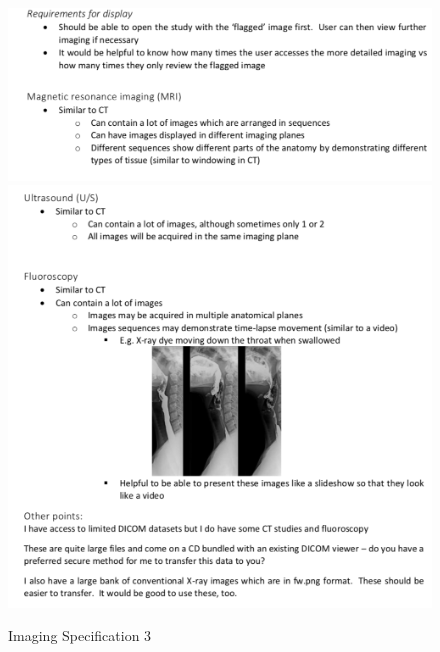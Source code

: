 \begin{figure}[ht]
\centering
\includegraphics[width = 0.95\hsize]{./figures/ImagingSpec3}
\includegraphics[width = 0.95\hsize]{./figures/ImagingSpec4}
\caption{Imaging Specification 3}
\end{figure}
